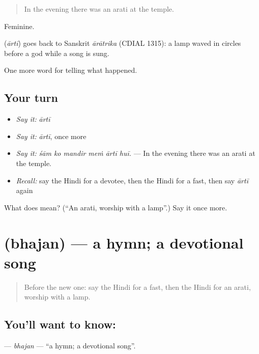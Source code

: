 \begin{quote}
In the evening there was an arati at the temple.
\end{quote}

Feminine.

\begin{cousinweb}
\textbf{} (\emph{ārtī}) goes back to Sanskrit \emph{ārātrika} (CDIAL 1315): a lamp waved in circles before a god while a song is sung.
\end{cousinweb}

\begin{grammarlens}[title={What you've built}]
One more word for telling what happened.
\end{grammarlens}

\subsection*{Your turn}
\begin{itemize}
\raggedright
  \item \emph{Say it:} \emph{ārtī}
  \item \emph{Say it:} \emph{ārtī}, once more
  \item \emph{Say it:} \emph{śām ko mandir meṁ ārtī huī.} — In the evening there was an arati at the temple.
  \item \emph{Recall:} say the Hindi for a devotee, then the Hindi for a fast, then say \emph{ārtī} again
\end{itemize}

\begin{tcolorbox}[breakable,colback=teal!4,colframe=teal!35!black,title={Before you move on}]
What does  mean? (\textquotedblleft{}An arati, worship with a lamp\textquotedblright{}.) Say it once more.
\end{tcolorbox}
\section[\texorpdfstring{\hi{भजन} (bhajan)}{भजन (bhajan)}]{ (bhajan) — a hymn; a devotional song}

\label{lesson:HI-C331-bhajan}



\begin{quote}
Before the new one: say the Hindi for a fast, then the Hindi for an arati, worship with a lamp.
\end{quote}

\subsection*{You'll want to know: }
\textbf{} — \emph{bhajan} — \textquotedblleft{}a hymn; a devotional song\textquotedblright{}.

